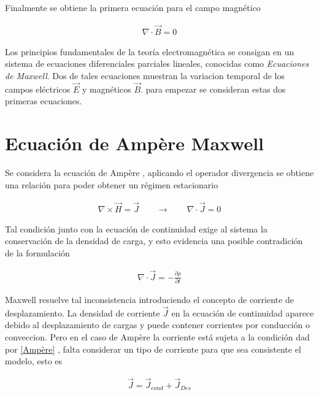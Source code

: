 Finalmente se obtiene la primera ecuación para el campo magnético 

\begin{eqnarray}
    \boxed{\nabla \cdot \vec{B} = 0}
\end{eqnarray}

\noindent Los principios fundamentales de la teoría electromagnética se consigan en un sistema de ecuaciones diferenciales parciales lineales, conocidas como \emph{Ecuaciones de Maxwell}. Dos de tales ecuaciones muestran la variacion temporal de los campos eléctricos $\vec{E}$ y magnéticos $\vec{B}$. para empezar se consideran estas dos primeras ecuaciones.\\



\section{Ecuación de Ampère Maxwell}

Se considera la ecuación de Ampère \cite{Jackson} , aplicando el operador divergencia se obtiene una relación para poder obtener un régimen estacionario



\begin{eqnarray}
    \label{Ampère}
    \nabla \times \vec{H} = \vec{J} \qquad  \longrightarrow  \qquad 
    \nabla \cdot \vec{J} = 0 
\end{eqnarray}

Tal condición junto con la ecuación de continuidad exige al sistema la conservación de la densidad de carga, y esto evidencia una posible contradición de la formulación

\begin{eqnarray}
    \nabla \cdot \vec{J} = -\frac{\partial \rho}{\partial t}
\end{eqnarray}

Maxwell resuelve tal inconsistencia introduciendo el concepto de corriente de desplazamiento. La densidad de corriente $\vec{J}$ en la ecuación de continuidad aparece debido al desplazamiento de cargas y puede contener corrientes por conducción o conveccion. Pero en el caso de Ampère la corriente está sujeta a la condición dad por  \eqref{Ampère} , falta considerar un tipo de corriente para que sea consistente el modelo, esto es

\begin{eqnarray}
    \vec{J} = \vec{J}_{cond} + \vec{J}_{Des}
\end{eqnarray}

